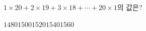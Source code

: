 $1\times 20+2\times 19+3\times 18+\cdots+20\times 1$의 값은?
\begin{choices32}{$1480$}{$1500$}{$1520$}{$1540$}{$1560$}\end{choices32}
